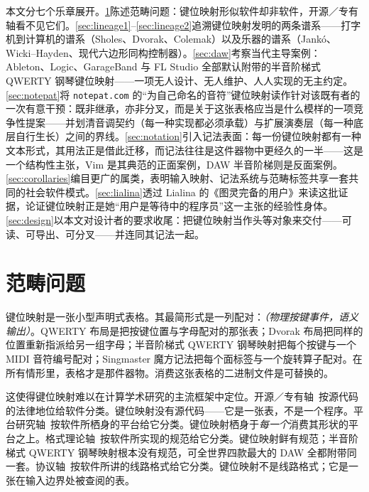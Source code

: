 \documentclass[10pt,letterpaper,twocolumn]{article}
\begin{document}
本文分七个乐章展开。\textsection\ref{sec:category}陈述范畴问题：键位映射形似软件却非软件，开源／专有轴看不见它们。\textsection\ref{sec:lineage1}--\ref{sec:lineage2}追溯键位映射发明的两条谱系——打字机到计算机的谱系（Sholes、Dvorak、Colemak）以及乐器的谱系（Jankó、Wicki--Hayden、现代六边形同构控制器）。\textsection\ref{sec:daw}考察当代主导案例：Ableton、Logic、GarageBand 与 FL Studio 全部默认附带的半音阶梯式 QWERTY 钢琴键位映射——一项无人设计、无人维护、人人实现的无主约定。\textsection\ref{sec:notepat}将 \texttt{notepat.com} 的“为自己命名的音符”键位映射读作针对该既有者的一次有意干预：既非继承，亦非分叉，而是关于这张表格应当是什么模样的一项竞争性提案——并划清音调契约（每一种实现都必须承载）与扩展演奏层（每一种底层自行生长）之间的界线。\textsection\ref{sec:notation}引入记法表面：每一份键位映射都有一种文本形式，其用法正是借此迁移，而记法往往是这件器物中更经久的一半——这是一个结构性主张，Vim 是其典范的正面案例，DAW 半音阶梯则是反面案例。\textsection\ref{sec:corollaries}编目更广的属类，表明输入映射、记法系统与范畴标签共享一套共同的社会软件模式。\textsection\ref{sec:lialina}透过 Lialina 的《图灵完备的用户》来读这批证据，论证键位映射正是她“用户是等待中的程序员”这一主张的经验性身体。\textsection\ref{sec:design}以本文对设计者的要求收尾：把键位映射当作头等对象来交付——可读、可导出、可分叉——并连同其记法一起。

\section{范畴问题}
\label{sec:category}

键位映射是一张小型声明式表格。其最简形式是一列配对：\emph{（物理按键事件，语义输出）}。QWERTY 布局是把按键位置与字母配对的那张表；Dvorak 布局把同样的位置重新指派给另一组字母；半音阶梯式 QWERTY 钢琴映射把每个按键与一个 MIDI 音符编号配对；Singmaster 魔方记法把每个面标签与一个旋转算子配对。在所有情形里，表格才是那件器物。消费这张表格的二进制文件是可替换的。

这使得键位映射难以在计算学术研究的主流框架中定位。开源／专有轴~\citep{galloway2004protocol}按源代码的法律地位给软件分类。键位映射没有源代码——它是一张表，不是一个程序。平台研究轴~\citep{nieborg2018platformization}按软件所栖身的平台给它分类。键位映射栖身于\emph{每一个}消费其形状的平台之上。格式理论轴~\citep{sterne2012mp3}按软件所实现的规范给它分类。键位映射鲜有规范；半音阶梯式 QWERTY 钢琴映射根本没有规范，可全世界四款最大的 DAW 全都附带同一套。协议轴~\citep{galloway2004protocol}按软件所讲的线路格式给它分类。键位映射不是线路格式；它是一张在输入边界处被查阅的表。
\end{document}
